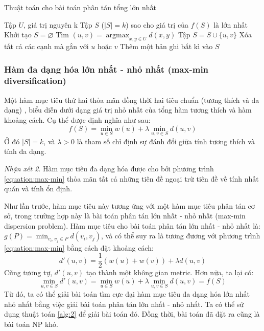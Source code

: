 \documentclass[12pt]{report}
\DeclarePairedDelimiter\floor{\lfloor}{\rfloor}
\DeclareMathOperator*{\argmax}{argmax}
\begin{document}
\begin{algorithm}
    \caption{Thuật toán cho bài toán phân tán tổng lớn nhất}
    \label{alg:1}
    \begin{algorithmic}
        \INPUT Tập $U$, giá trị nguyên k 
        \OUTPUT Tập $S$ ($|S|=k$) sao cho giá trị của $f(S)$ là lớn nhất
        \State Khởi tạo $S = \varnothing$
            \State Tìm $(u, v) = \argmax_{x, y \in U} d(x, y)$
            \State Tập $S = S \cup \{u, v\}$
            \State Xóa tất cả các cạnh mà gắn với $u$ hoặc $v$ 
        \EndFor
            \State Thêm một bản ghi bất kì vào $S$ 
        \EndIf
    \end{algorithmic}
\end{algorithm}

\subsubsection{Hàm đa dạng hóa lớn nhất - nhỏ nhất 
(max-min diversification)}
Một hàm mục tiêu thứ hai thỏa mãn đồng thời hai tiêu chuẩn 
(tương thích và đa dạng)
, biểu diễn dưới dạng giá trị nhỏ nhất của tổng hàm tương thích và hàm 
khoảng cách. Cụ thể được định nghĩa như sau: 
\begin{equation}
    \label{equation:max-min}
    f(S) = \min_{u \in S} w(u) + 
    \lambda \min_{u, v \in S} d(u, v)
\end{equation}
Ở đó $|S| = k$, và $\lambda > 0$ là tham số chỉ định sự đánh đổi giữa 
tính tương thích và tính đa dạng. 

\textit{Nhận xét 2}. Hàm mục tiêu đa dạng hóa được cho bởi phương trình
\ref{equation:max-min} thỏa mãn tất cả những tiên đề ngoại trừ tiên đề 
về tính nhất quán và tính ổn định.

Như lần trước, hàm mục tiêu này tương ứng với một hàm mục tiêu phân tán 
cơ sở, trong trường hợp này là bài toán phân tán lớn nhất - nhỏ nhất 
(max-min dispersion problem). Hàm mục tiêu cho bài toán phân tán 
lớn nhất - nhỏ nhất là: 
$g(P) = \min_{v_i, v_j \in P} d(v_i, v_j)$, và có thể suy ra là tương 
đương với phương trình \ref{equation:max-min} bằng cách đặt khoảng cách: 
\begin{equation}
    d'(u, v) = \frac{1}{2}(w(u) + w(v)) + \lambda d(u, v)
\end{equation}
Cũng tương tự, $d'(u, v)$ tạo thành một không gian metric. Hơn nữa, ta 
lại có: 
$$
\min_{u, v \in S} d'(u, v) = \min_{u \in S} w(u)  
+ \lambda \min_{u, v \in S} d(u, v) = f(S)
$$
Từ đó, ta có thể giải bài toán tìm cực đại hàm mục tiêu đa dạng hóa lớn 
nhất nhỏ nhất bằng việc giải bài toán phân tán lớn nhất - nhỏ nhất. 
Ta có thể sử dụng thuật toán \ref{alg:2} để giải bài toán đó. 
Đồng thời, bài toán đã đặt ra cũng là bài toán NP khó. 
\end{document}
